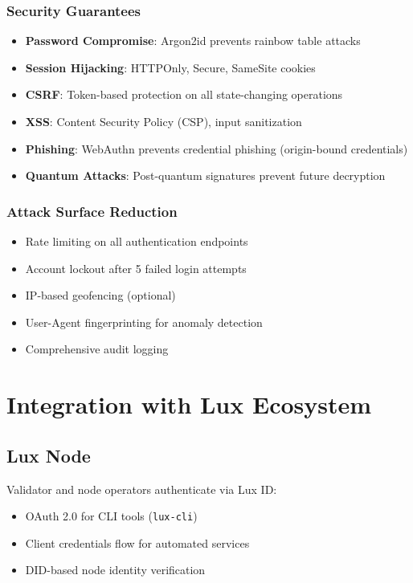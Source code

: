 \documentclass[11pt,a4paper]{article}
\begin{document}
\subsubsection{Security Guarantees}

\begin{itemize}
  \item \textbf{Password Compromise}: Argon2id prevents rainbow table attacks
  \item \textbf{Session Hijacking}: HTTPOnly, Secure, SameSite cookies
  \item \textbf{CSRF}: Token-based protection on all state-changing operations
  \item \textbf{XSS}: Content Security Policy (CSP), input sanitization
  \item \textbf{Phishing}: WebAuthn prevents credential phishing (origin-bound credentials)
  \item \textbf{Quantum Attacks}: Post-quantum signatures prevent future decryption
\end{itemize}

\subsubsection{Attack Surface Reduction}

\begin{itemize}
  \item Rate limiting on all authentication endpoints
  \item Account lockout after 5 failed login attempts
  \item IP-based geofencing (optional)
  \item User-Agent fingerprinting for anomaly detection
  \item Comprehensive audit logging
\end{itemize}

\section{Integration with Lux Ecosystem}

\subsection{Lux Node}

Validator and node operators authenticate via Lux ID:
\begin{itemize}
  \item OAuth 2.0 for CLI tools (\texttt{lux-cli})
  \item Client credentials flow for automated services
  \item DID-based node identity verification
\end{itemize}
\end{document}
